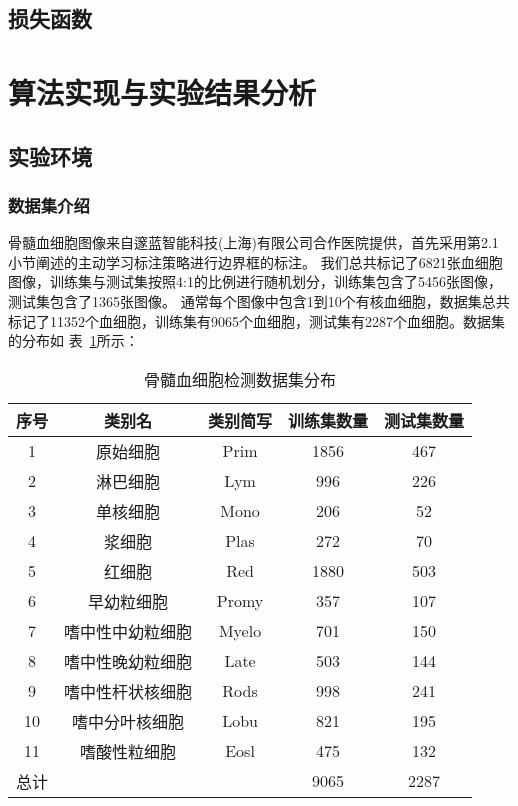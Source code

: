\subsection{损失函数}

\section{算法实现与实验结果分析}
\subsection{实验环境}
\subsubsection{数据集介绍}

骨髓血细胞图像来自邃蓝智能科技(上海)有限公司合作医院提供，首先采用第2.1小节阐述的主动学习标注策略进行边界框的标注。
我们总共标记了6821张血细胞图像，训练集与测试集按照4:1的比例进行随机划分，训练集包含了5456张图像，测试集包含了1365张图像。
通常每个图像中包含1到10个有核血细胞，数据集总共标记了11352个血细胞，训练集有9065个血细胞，测试集有2287个血细胞。数据集的分布如
表~\ref{table:cell_detect1}所示：

\begin{table}
  \caption{骨髓血细胞检测数据集分布}   
  \centering 
  \label{table:cell_detect1}
  \begin{tabular}{ccccc}
    \toprule[2pt]
    序号 & 类别名  &  类别简写 & 训练集数量 & 测试集数量 \\
    \midrule[1.5pt] 
    1 & 原始细胞 & Prim & 1856 & 467 \\ 
    2 & 淋巴细胞 & Lym & 996 & 226   \\ 
    3 & 单核细胞 & Mono & 206 & 52   \\ 
    4 & 浆细胞 & Plas & 272 & 70   \\ 
    5 & 红细胞 & Red & 1880 & 503   \\ 
    6 & 早幼粒细胞 & Promy & 357 & 107   \\ 
    7 & 嗜中性中幼粒细胞 & Myelo & 701 & 150   \\ 
    8 & 嗜中性晚幼粒细胞 & Late & 503 & 144   \\ 
    9 & 嗜中性杆状核细胞 & Rods & 998 & 241   \\  
    10 & 嗜中分叶核细胞 & Lobu & 821 & 195   \\  
    11 & 嗜酸性粒细胞 & Eosl & 475 & 132   \\  
    \hline
    总计 &   &   & 9065 & 2287 \\
    \bottomrule[2pt]      
  \end{tabular} 
\end{table}

